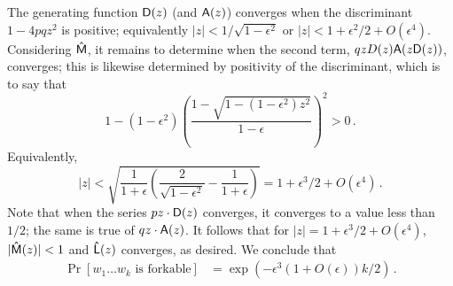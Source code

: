   The generating function $\mathsf{D}(z)$ (and $\mathsf{A}(z)$) converges when
  the discriminant $1 - 4pqz^2$ is positive; equivalently
  $|z| < 1/\sqrt{1 - \epsilon^2}$ or
  $|z| < 1 + \epsilon^2/2 + O(\epsilon^4)$. Considering
  $\mathsf{\hat{M}}$, it remains to determine when the second term,
  $qz D(z) \mathsf{A}(z \mathsf{D}(z))$, converges; this is likewise determined by
  positivity of the discriminant, which is to say that
  \[
    1 - (1 - \epsilon^2)\left(\frac{1 - \sqrt{1 - (1 - \epsilon^2)z^2}}{1 - \epsilon}\right)^2 > 0\,.
  \]
  Equivalently,
  \[
    |z| <  \sqrt{\frac{1}{1 + \epsilon}\left(\frac{2}{\sqrt{1 - \epsilon^2}} - \frac{1}{1+\epsilon}\right)} = 1 + \epsilon^3/2 + O(\epsilon^4) 
		\, .	
  \]
  Note that when the series $pz \cdot \mathsf{D}(z)$ converges, it
  converges to a value less than $1/2$; the same is true of
  $qz \cdot \mathsf{A}(z)$. It follows that for
  $|z| = 1 + \epsilon^3/2 + O(\epsilon^4)$, $|\mathsf{\hat{M}}(z)| < 1$
  and $\mathsf{\hat{L}}(z)$ converges, as desired. We conclude that
	\begin{align}
	  \Pr[\text{$w_1 \ldots w_k$ is forkable}] &= \exp(-\epsilon^3(1 + O(\epsilon))k/2)\,.
	\label{eq:prob_forkable_gf}
	\end{align}

